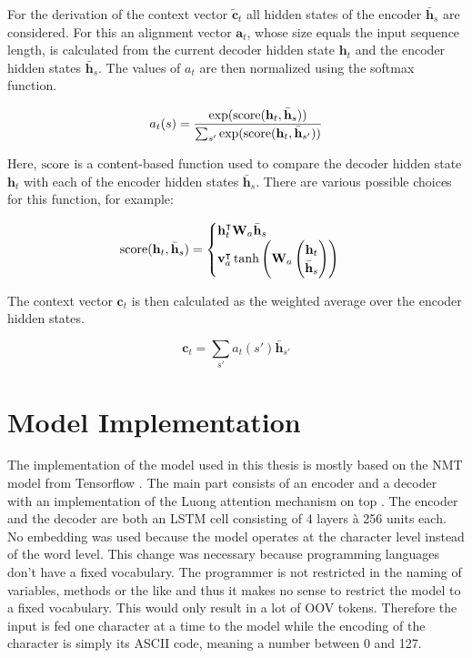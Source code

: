 For the derivation of the context vector \(\tilde{\mathbf{c}}_t\) all hidden states of the encoder \(\bar{\mathbf{h}}_s\) are considered. For this an alignment vector \(\mathbf{a}_t\), whose size equals the input sequence length, is calculated from the current decoder hidden state \(\mathbf{h}_t\) and the encoder hidden states \(\bar{\mathbf{h}}_s\). The values of \(a_t\) are then normalized using the softmax function.

\begin{equation*}
  a_t(s) = \frac
            {\exp(\operatorname{score}(\mathbf{h}_t, \bar{\mathbf{h}}_s))}
            {\sum_{s'} \exp(\operatorname{score}(\mathbf{h}_t, \bar{\mathbf{h}}_{s'}))}
\end{equation*}

Here, \(\operatorname{score}\) is a content-based function used to compare the decoder hidden state \(\mathbf{h}_t\) with each of the encoder hidden states \(\bar{\mathbf{h}}_s\). There are various possible choices for this function, for example:

\begin{equation*}
  \operatorname{score}(\mathbf{h}_t, \bar{\mathbf{h}}_s) =
  \begin{cases}
    \mathbf{h}_t^\intercal \mathbf{W}_a \bar{\mathbf{h}}_s \\
    \mathbf{v}_a^\intercal \tanh \left(\mathbf{W}_a \begin{pmatrix} \mathbf{h}_t \\ \bar{\mathbf{h}}_s \end{pmatrix} \right)
  \end{cases}
\end{equation*}

The context vector \(\mathbf{c}_t\) is then calculated as the weighted average over the encoder hidden states.

\begin{equation*}
  \mathbf{c}_t = \sum_{s'} a_t(s') \bar{\mathbf{h}}_{s'}
\end{equation*}

\section{Model Implementation}

The implementation of the model used in this thesis is mostly based on the NMT model from Tensorflow \cite{seq2seq_tutorial}. The main part consists of an encoder and a decoder with an implementation of the Luong attention mechanism on top \cite{attention_luong}. The encoder and the decoder are both an LSTM cell consisting of 4 layers \`a 256 units each. No embedding was used because the model operates at the character level instead of the word level. This change was necessary because programming languages don't have a fixed vocabulary. The programmer is not restricted in the naming of variables, methods or the like and thus it makes no sense to restrict the model to a fixed vocabulary. This would only result in a lot of OOV tokens. Therefore the input is fed one character at a time to the model while the encoding of the character is simply its ASCII code, meaning a number between 0 and 127.

